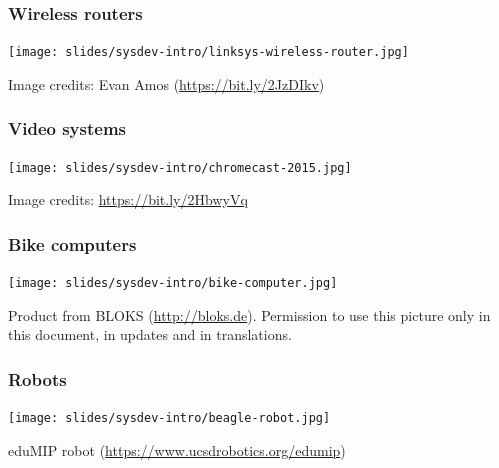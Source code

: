 \begin{frame}
  \frametitle{Wireless routers}
  \begin{center}
    \texttt{[image: slides/sysdev-intro/linksys-wireless-router.jpg]}
  \end{center}
  \tiny
  Image credits: Evan Amos (\url{https://bit.ly/2JzDIkv})
\end{frame}

\begin{frame}
\frametitle{Video systems}
  \begin{center}
    \texttt{[image: slides/sysdev-intro/chromecast-2015.jpg]}
  \end{center}
  \tiny Image credits: \url{https://bit.ly/2HbwyVq}
\end{frame}

\begin{frame}
\frametitle{Bike computers}
  \begin{center}
    \texttt{[image: slides/sysdev-intro/bike-computer.jpg]}
  \end{center}
  \tiny
  Product from BLOKS (\url{http://bloks.de}).
  Permission to use this picture only in this document, in updates and
  in translations.
\end{frame}

\begin{frame}
\frametitle{Robots}
  \begin{center}
    \texttt{[image: slides/sysdev-intro/beagle-robot.jpg]}
  \end{center}
  eduMIP robot (\url{https://www.ucsdrobotics.org/edumip})
\end{frame}

